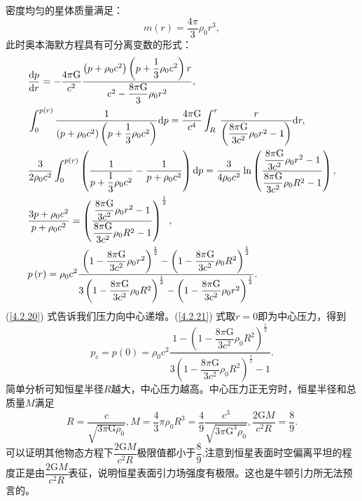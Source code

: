 \documentclass[11pt, a4paper, oneside, onecolumn]{ctexart}
\numberwithin{equation}{subsection}
\begin{document}
密度均匀的星体质量满足：
\begin{equation}
m\left(r\right)=\frac{4\pi}{3}\rho_{0}r^{3},\label{4.2.19}
\end{equation}
此时奥本海默方程具有可分离变数的形式：
\begin{align}
&\frac{\mathrm{d}p}{\mathrm{d}r}=-\frac{4\pi\mathrm{G}}{c^{2}}\frac{\left(p+\rho_{0}c^{2}\right)\left(p+\dfrac{1}{3}\rho_{0}c^{2}\right)r}{c^{2}-\dfrac{8\pi\mathrm{G}}{3}\rho_{0}r^{2}},\label{4.2.20}\\
&\int_{0}^{p\left(r\right)}\frac{1}{\left(p+\rho_{0}c^{2}\right)\left(p+\dfrac{1}{3}\rho_{0}c^{2}\right)}\mathrm{d}p=\frac{4\pi\mathrm{G}}{c^{4}}\int_{R}^{r}\frac{r}{\left(\dfrac{8\pi\mathrm{G}}{3c^{2}}\rho_{0}r^{2}-1\right)}\mathrm{d}r,\notag\\
&\frac{3}{2\rho_{0}c^{2}}\int_{0}^{p\left(r\right)}\left(\frac{1}{p+\dfrac{1}{3}\rho_{0}c^{2}}-\frac{1}{p+\rho_{0}c^{2}}\right)\mathrm{d}p=\frac{3}{4\rho_{0}c^{2}}\ln\left(\frac{\dfrac{8\pi\mathrm{G}}{3c^{2}}\rho_{0}r^{2}-1}{\dfrac{8\pi\mathrm{G}}{3c^{2}}\rho_{0}R^{2}-1}\right),\notag\\
&\frac{3p+\rho_{0}c^{2}}{p+\rho_{0}c^{2}}=\left(\frac{\dfrac{8\pi\mathrm{G}}{3c^{2}}\rho_{0}r^{2}-1}{\dfrac{8\pi\mathrm{G}}{3c^{2}}\rho_{0}R^{2}-1}\right)^{\frac{1}{2}},\notag\\
&p\left(r\right)=\rho_{0}c^{2}\frac{\left(1-\dfrac{8\pi\mathrm{G}}{3c^{2}}\rho_{0}r^{2}\right)^{\frac{1}{2}}-\left(1-\dfrac{8\pi\mathrm{G}}{3c^{2}}\rho_{0}R^{2}\right)^{\frac12}}{3\left(1-\dfrac{8\pi\mathrm{G}}{3c^{2}}\rho_{0}R^{2}\right)^{\frac12}-\left(1-\dfrac{8\pi\mathrm{G}}{3c^{2}}\rho_{0}r^{2}\right)^{\frac{1}{2}}}.\label{4.2.21}
\end{align}
(\ref{4.2.20}) 式告诉我们压力向中心递增。(\ref{4.2.21}) 式取$r=0$即为中心压力，得到
\begin{equation}
p_{c}=p\left(0\right)=\rho_{0}c^{2}\frac{1-\left(1-\dfrac{8\pi\mathrm{G}}{3c^{2}}\rho_{0}R^{2}\right)^{\frac12}}{3\left(1-\dfrac{8\pi\mathrm{G}}{3c^{2}}\rho_{0}R^{2}\right)^{\frac12}-1}.
\end{equation}
简单分析可知恒星半径$R$越大，中心压力越高。中心压力正无穷时，恒星半径和总质量$M$满足
\begin{equation}
R=\frac{c}{\sqrt{3\pi\mathrm{G}\rho_{0}}},M=\frac{4}{3}\pi \rho_{0}R^{3}=\frac{4}{9}\frac{c^{3}}{\sqrt{3\pi\mathrm{G}^{3}\rho_{0}}},\frac{2\mathrm{G}M}{c^{2}R}=\frac{8}{9}.
\end{equation}
可以证明其他物态方程下$\dfrac{2\mathrm{G}M}{c^{2}R}$极限值都小于$\dfrac{8}{9}$,注意到恒星表面时空偏离平坦的程度正是由$\dfrac{2\mathrm{G}M}{c^{2}R}$表征，说明恒星表面引力场强度有极限。这也是牛顿引力所无法预言的。
\end{document}
